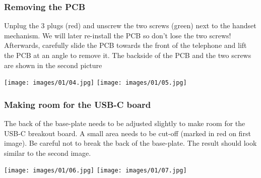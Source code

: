 \documentclass[]{article}
\begin{document}
\subsubsection{Removing the PCB}
\begin{minipage}[t]{0.4\linewidth}
	\vspace{0pt}
	Unplug the 3 plugs (red) and unscrew the two screws (green) next to the handset mechanism. We will later re-install the PCB so don't lose the two screws!
	\newline
	\newline
	Afterwards, carefully slide the PCB towards the front of the telephone and lift the PCB at an angle to remove it. The backside of the PCB and the two screws are shown in the second picture
\end{minipage}
\hfill
\begin{minipage}[t]{0.5\linewidth}
	\vspace{0pt}
	\texttt{[image: images/01/04.jpg]}
	\texttt{[image: images/01/05.jpg]}
\end{minipage}

\subsubsection{Making room for the USB-C board}
\begin{minipage}[t]{0.4\linewidth}
	\vspace{0pt}
	The back of the base-plate needs to be adjusted slightly to make room for the USB-C breakout board.
	\newline
	\newline
	A small area needs to be cut-off (marked in red on first image). Be careful not to break the back of the base-plate.
	\newline
	\newline
	The result should look similar to the second image.
\end{minipage}
\hfill
\begin{minipage}[t]{0.5\linewidth}
	\vspace{0pt}
	\texttt{[image: images/01/06.jpg]}
	\texttt{[image: images/01/07.jpg]}
\end{minipage}
\end{document}

